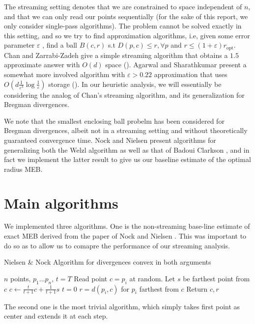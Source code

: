\documentclass[11pt]{myclass}
\newcommand{\eps}{\varepsilon}
\begin{document}
The streaming setting denotes that we are constrained to space independent of $n$, and that we can only read our points sequentially (for the sake of this report, we only consider single-pass algorithms). The problem cannot be solved exactly in this setting, and so we try to find approximation algorithms, i.e, given some error parameter $\eps$ , find a ball $B(c,r)$ s.t $D(p,c) \leq r, \forall p$ and $r \leq (1+\eps)r_{\text{opt}}$.
Chan and Zarrabi-Zadeh give a simple streaming algorithm that obtains a $1.5$ approximate answer with $O(d)$ space (\cite{onepointfive}).
 Agarwal and  Sharathkumar present a somewhat more involved algorithm with $\eps > 0.22$ approximation that uses $O(d \frac{1}{\eps^3}\log \frac{1}{\eps} )$ storage (\cite{agarwal}). In our heuristic analysis, we will essentially be considering the analog of Chan's streaming algorithm, and its
generalization for Bregman divergences.

We note that the smallest enclosing ball probelm has been considered for Bregman divergences, albeit not in a streaming setting and without 
theoretically guaranteed convergence time. Nock and Nielsen present algorithms for generalizing both the Welzl algorithm \cite{bwz} as well as that of Badoui Clarkson \cite{bbc}, and in fact we implement the latter result to give us our baseline estimate of the optimal radius MEB.  

\section{Main algorithms}
We implemented three algorithms. One is the non-streaming base-line estimate of exact MEB derived from the paper of Nock and Nielsen \cite{bbc}. This was important to do so as to allow us to comapre the performance of our streaming analysis.

\begin{algorithm}
  \caption{Nielsen \& Nock Algorithm for divergences convex in both arguments}
  \begin{algorithmic}
    \STATE $n$ points, $p_1 \ldots p_n$, $t = T$
    \STATE Read point $c = p_i$ at random. 
    \REPEAT 
      \STATE Let $s$ be farthest point from $c$
      \STATE $c \leftarrow \frac{t}{t+1} c + \frac{1}{t+1} s$
    \UNTIL $t = 0$
    \STATE $r = d(p_i, c)$ for $p_i$ farthest from $c$
    \STATE Return $c, r$
  \end{algorithmic}
  \label{bbalgo}
\end{algorithm}

The second one is the most trivial algorithm, which simply takes first point as center and extends it at each step.
\end{document}
